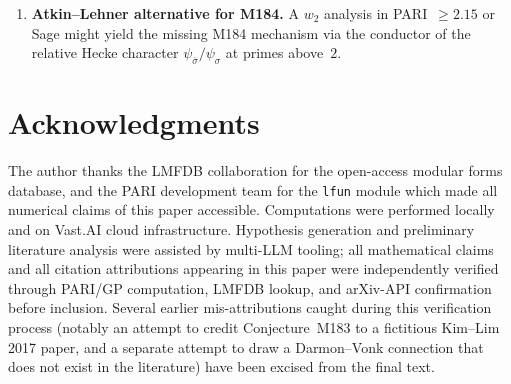\documentclass[12pt]{amsart}
\theoremstyle{definition}
\begin{document}
\begin{enumerate}[leftmargin=2em,label=\textbf{OP\arabic*.}]
        the empirical statement. A first sweep over $h = 3$ fields
        with $D \in \{-23, -31, -59, -83, -107, -139, -211, -283\}$
        found \emph{zero} rational CM weight-$5$ newforms at any level
        $\le 400$; the precise reconciliation of this negative result
        with the $h = 4$ existence at $D = -84$ deserves attention.
  \item \textbf{Atkin--Lehner alternative for M184.} A $w_2$ analysis
        in PARI~$\geq 2.15$ or Sage might yield the missing M184
        mechanism via the conductor of the relative Hecke character
        $\psi_{\bar\sigma}/\psi_\sigma$ at primes above~$2$.
\end{enumerate}

\section*{Acknowledgments}

The author thanks the LMFDB collaboration for the open-access modular
forms database, and the PARI development team for the \texttt{lfun}
module which made all numerical claims of this paper accessible.
Computations were performed locally and on Vast.AI cloud
infrastructure. Hypothesis generation and preliminary literature
analysis were assisted by multi-LLM tooling;
all mathematical claims and all citation attributions appearing in this
paper were independently verified through PARI/GP computation, LMFDB
lookup, and ar\textsc{X}iv-API confirmation before inclusion. Several
earlier mis-attributions caught during this verification process
(notably an attempt to credit Conjecture~M183 to a fictitious
Kim--Lim 2017 paper, and a separate
attempt to draw a Darmon--Vonk connection that does not exist in the
literature) have been excised from the final text.

\end{document}
